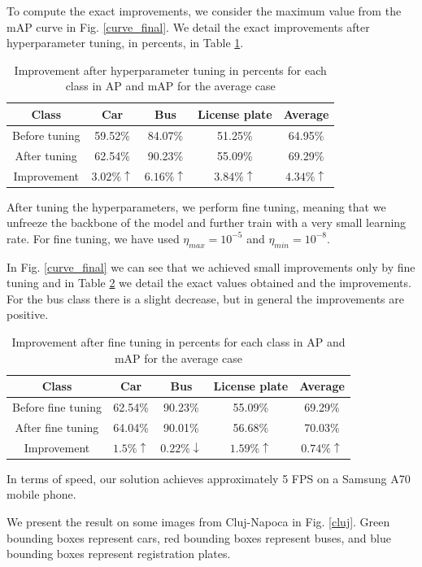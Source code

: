     To compute the exact improvements, we consider the maximum value from the mAP curve in Fig. \ref{curve_final}. We detail the exact improvements after hyperparameter tuning, in percents, in Table \ref{improvement_values}. 
    
    \begin{table}[H]
    \centering
    \caption{Improvement after hyperparameter tuning in percents for each class in AP and mAP for the average case}
    \begin{tabular}{c|c|c|c|c}
    Class         & Car     & Bus     & License plate & Average \\ \hline
    Before tuning & 59.52\% & 84.07\% & 51.25\%       & 64.95\% \\ \hline
    After tuning  & 62.54\% & 90.23\% & 55.09\%       & 69.29\% \\ \hline
    Improvement   & $3.02\% \uparrow$    & $6.16\% \uparrow$    & $3.84\% \uparrow$          & $4.34\% \uparrow$    
    \end{tabular}
    
    \label{improvement_values}
    \end{table}
    
    After tuning the hyperparameters, we perform fine tuning, meaning that we unfreeze the backbone of the model and further train with a very small learning rate. For fine tuning, we have used $\eta_{max}=10^{-5}$ and $\eta_{min}=10^{-8}$. 
    
    In Fig. \ref{curve_final} we can see that we achieved small improvements only by fine tuning and in Table \ref{improvement_values_finetuning} we detail the exact values obtained and the improvements. For the bus class there is a slight decrease, but in general the improvements are positive.

    \begin{table}[h]
    \centering
      \caption{Improvement after fine tuning in percents for each class in AP and mAP for the average case}
    \begin{tabular}{c|c|c|c|c}
    Class              & Car     & Bus     & License plate & Average \\ \hline
    Before fine tuning & 62.54\% & 90.23\% & 55.09\%       & 69.29\% \\ \hline
    After fine tuning  & 64.04\% & 90.01\% & 56.68\%       & 70.03\% \\ \hline
    Improvement        & $1.5\% \uparrow$   & $0.22\% \downarrow$ & $1.59\% \uparrow$        & $0.74\% \uparrow$ 
    \end{tabular}
  
    \label{improvement_values_finetuning}
    \end{table}
    
    
    
    In terms of speed, our solution achieves approximately 5 FPS on a Samsung A70 mobile phone.
    
    We present the result on some images from Cluj-Napoca in Fig. \ref{cluj}. Green bounding boxes represent cars, red bounding boxes represent buses, and blue bounding boxes represent registration plates.
    
